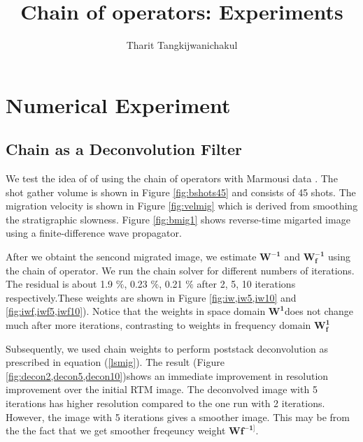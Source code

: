 \title{Chain of operators: Experiments}
\renewcommand{\thefootnote}{\fnsymbol{footnote}}
\relax{}
\author{Tharit Tangkijwanichakul}
\label{ch:chapter-lsrtm}

\maketitle

\section{Numerical Experiment}

\subsection{Chain as a Deconvolution Filter}
We test the idea of of using the chain of operators with Marmousi data \cite[]{versteeg1994}. The shot gather volume is shown in Figure \ref{fig:bshots45} and consists of 45 shots. The migration velocity is shown in Figure \ref{fig:velmig} which is derived from smoothing the stratigraphic slowness. Figure \ref{fig:bmig1} shows reverse-time migarted image using a finite-difference wave propagator. 



After we obtaint the sencond migrated image, we estimate $\mathbf{W^{-1}}$ and $\mathbf{W_f^{-1}}$ using the chain of operator. 
We run the chain solver for different numbers of iterations. The residual is about 1.9 $\%$, 0.23 $\%$, 0.21 $\%$ after 2, 5, 10 iterations respectively.These weights are shown in Figure \ref{fig:iw,iw5,iw10} and \ref{fig:iwf,iwf5,iwf10}). Notice that the weights in space domain $\mathbf{W^{1}}$does not change much after more iterations, contrasting to weights in frequency domain $\mathbf{W_f^{1}}$




Subsequently, we used chain weights to perform poststack deconvolution as prescribed in equation (\ref{lsmig}). The result (Figure \ref{fig:decon2,decon5,decon10})shows an immediate improvement in resolution improvement over the initial RTM image. The deconvolved image with 5 iterations has higher resolution compared to the one run with 2 iterations. However, the image with 5 iterations gives a smoother image. This may be from the the fact that we get smoother freqeuncy weight $\mathbf{Wf^{-1]}}$.

